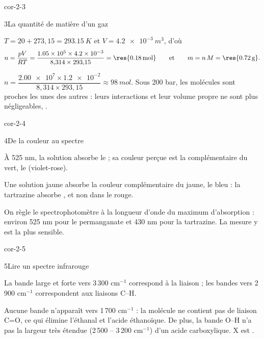 \begin{blocLivre}{cor-2-3}
\begin{corrige}{3}{La quantité de matière d'un gaz}
\begin{questions}
\item $T=20+273{,}15=\qty{293,15}{K}$ et $V=\qty{4,2e-3}{m^3}$, d'où
\[n=\frac{pV}{RT}=\frac{\num{1.05e5}\times\num{4.2e-3}}{8{,}314\times293{,}15}=\res{\qty{0,18}{mol}}
\qquad\text{et}\qquad m=n\,M=\res{\qty{0,72}{g}}.\]
\item $n=\dfrac{\num{2.00e7}\times\num{1.2e-2}}{8{,}314\times293{,}15}\approx\qty{98}{mol}$. Sous 200 bar, les
molécules sont proches les unes des autres : leurs interactions et leur volume propre ne sont plus négligeables,
.
\end{questions}
\end{corrige}
\end{blocLivre}
\begin{blocLivre}{cor-2-4}
\begin{corrige}{4}{De la couleur au spectre}
\begin{questions}
\item À 525 nm, la solution absorbe le  ; sa couleur perçue est la complémentaire du vert,
le  (violet-rose).
\item Une solution jaune absorbe la couleur complémentaire du jaune, le bleu : la tartrazine absorbe
, et non dans le rouge.
\item On règle le spectrophotomètre à la longueur d'onde du maximum d'absorption : environ 525 nm pour le
permanganate et 430 nm pour la tartrazine. La mesure y est la plus sensible.
\end{questions}
\end{corrige}
\end{blocLivre}
\begin{blocLivre}{cor-2-5}
\begin{corrige}{5}{Lire un spectre infrarouge}
\begin{questions}
\item La bande large et forte vers 3\,300 cm$^{-1}$ correspond à la liaison  ;
les bandes vers 2\,900 cm$^{-1}$ correspondent aux liaisons C--H.
\item Aucune bande n'apparaît vers 1\,700 cm$^{-1}$ : la molécule ne contient pas de liaison C=O, ce qui élimine
l'éthanal et l'acide éthanoïque. De plus, la bande O--H n'a pas la largeur très étendue (2\,500 -- 3\,200 cm$^{-1}$)
d'un acide carboxylique. X est  .
\end{questions}
\end{corrige}
\end{blocLivre}
